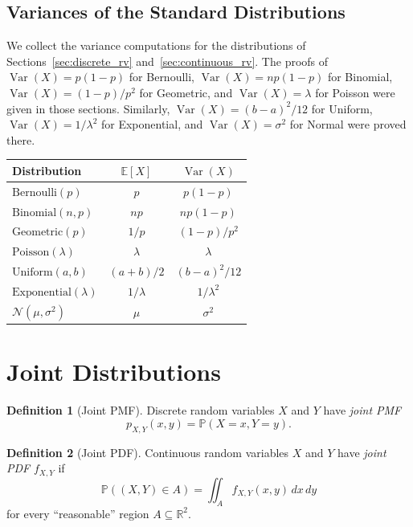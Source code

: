\documentclass[11pt,a4paper]{article}
\theoremstyle{definition}
\newtheorem{definition}{Definition}[section]
\theoremstyle{plain}
\theoremstyle{remark}
\newcommand{\R}{\mathbb{R}}
\newcommand{\E}{\mathbb{E}}
\newcommand{\Prob}{\mathbb{P}}
\DeclareMathOperator{\Var}{Var}
\begin{document}
\subsection{Variances of the Standard Distributions}

We collect the variance computations for the distributions of Sections~\ref{sec:discrete_rv}
and~\ref{sec:continuous_rv}. The proofs of $\Var(X) = p(1-p)$ for Bernoulli,
$\Var(X) = np(1-p)$ for Binomial, $\Var(X) = (1-p)/p^2$ for Geometric, and
$\Var(X) = \lambda$ for Poisson were given in those sections. Similarly,
$\Var(X) = (b-a)^2/12$ for Uniform, $\Var(X) = 1/\lambda^2$ for Exponential, and
$\Var(X) = \sigma^2$ for Normal were proved there.

\begin{center}
\begin{tabular}{lcc}
\toprule
Distribution & $\E[X]$ & $\Var(X)$ \\
\midrule
$\mathrm{Bernoulli}(p)$ & $p$ & $p(1-p)$ \\
$\mathrm{Binomial}(n,p)$ & $np$ & $np(1-p)$ \\
$\mathrm{Geometric}(p)$ & $1/p$ & $(1-p)/p^2$ \\
$\mathrm{Poisson}(\lambda)$ & $\lambda$ & $\lambda$ \\
$\mathrm{Uniform}(a,b)$ & $(a+b)/2$ & $(b-a)^2/12$ \\
$\mathrm{Exponential}(\lambda)$ & $1/\lambda$ & $1/\lambda^2$ \\
$\mathcal{N}(\mu, \sigma^2)$ & $\mu$ & $\sigma^2$ \\
\bottomrule
\end{tabular}
\end{center}

\section{Joint Distributions}
\label{sec:joint}

\begin{definition}[Joint PMF]
\label{def:joint_pmf}
Discrete random variables $X$ and $Y$ have \emph{joint PMF}
\[
    p_{X,Y}(x,y) = \Prob(X = x, Y = y).
\]
\end{definition}

\begin{definition}[Joint PDF]
\label{def:joint_pdf}
Continuous random variables $X$ and $Y$ have \emph{joint PDF} $f_{X,Y}$ if
\[
    \Prob((X,Y) \in A) = \iint_A f_{X,Y}(x,y)\,dx\,dy
\]
for every ``reasonable'' region $A \subseteq \R^2$.
\end{definition}
\end{document}
